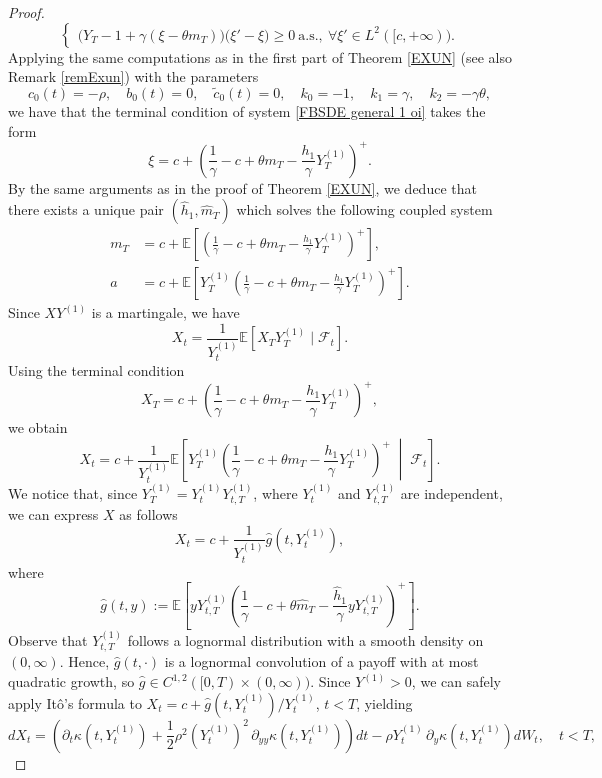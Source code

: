 \documentclass[10pt,a4paper]{amsart}
\begin{document}
\begin{proof}
\begin{equation}
\begin{cases}
       
        \big(Y_T-1+\gamma(\xi -\theta m_T)\big)\big( \xi'-\xi \big) \geq 0 \ \text{a.s.}, \ \forall \xi' \in L^2([c,+\infty)) .
\end{cases}
\end{equation}
Applying the same computations as in the first part of Theorem \ref{EXUN} (see also Remark \ref{remExun}) with the parameters
\[
c_0(t) = -\rho, \quad b_0(t) = 0, \quad \tilde{c}_0(t) = 0, \quad k_0 = -1, \quad k_1 = \gamma, \quad k_2 =-\gamma\theta,
\]
we have that the terminal condition of system \eqref{FBSDE general 1 oi} takes the form 
\begin{equation}
\label{terminal_X}
\xi=c + \left( \frac{1}{\gamma} - c + \theta m_T - \frac{h_1}{\gamma} Y_T^{(1)} \right)^{+}.
\end{equation}
By the same arguments as in the proof of Theorem \ref{EXUN}, we deduce that there exists a unique  pair $(\hat h_1, \hat m_T)$  which solves the following  coupled system
\begin{align*}
m_T &= c + \mathbb{E} \left[ \left( \frac{1}{\gamma} - c + \theta m_T - \frac{h_1}{\gamma} Y_T^{(1)} \right)^{+} \right], \\
a &= c + \mathbb{E} \left[ Y_T^{(1)} \left( \frac{1}{\gamma} - c + \theta m_T - \frac{h_1}{\gamma} Y_T^{(1)} \right)^{+} \right].
\end{align*}
Since \(X Y^{(1)}\) is a martingale, we have
\[
X_t = \frac{1}{Y_t^{(1)}}
\mathbb{E}\left[ X_T Y_T^{(1)} \mid \mathcal{F}_t \right].
\]
Using the terminal condition
\[X_T=c+\left(\frac{1}{\gamma} - c + \theta m_T-\frac{h_1}{\gamma} Y_T^{(1)}\right)^+,
\]
we obtain
\[
X_t=c+\frac{1}{Y_t^{(1)}}\mathbb{E}\left[Y_T^{(1)}
\left(\frac{1}{\gamma} - c + \theta m_T-\frac{h_1}{\gamma} Y_T^{(1)}\right)^+\;\middle|\;\mathcal{F}_t\right].\]
We notice that, since $Y^{(1)}_T = Y^{(1)}_t Y^{(1)}_{t,T}$, where $Y^{(1)}_t$ and $Y^{(1)}_{t,T}$ are independent, we can express $X$ as follows
\[
X_t = c + \frac{1}{Y^{(1)}_t} \hat g(t, Y^{(1)}_t),
\]
where
\[
\hat g(t,y) := \mathbb{E}\!\left[ yY^{(1)}_{t,T} \left(\frac{1}{\gamma} - c + \theta \hat m_T- \frac{\hat h_1 }{\gamma}yY^{(1)}_{t,T} \right)^+ \right].\]
Observe that $Y^{(1)}_{t,T}$ follows a lognormal distribution with a smooth density on $(0,\infty)$. Hence, $\hat g(t,\cdot)$ is a lognormal convolution of a payoff with at most quadratic growth, so $\hat g \in C^{1,2}([0,T) \times (0, \infty))$. Since $Y^{(1)} > 0$, we can safely apply It\^o's formula to $X_t = c+  \hat g(t,Y^{(1)}_t)/Y^{(1)}_t$, $t<T$, yielding
\[
dX_t = \left(\partial_t \kappa (t,Y^{(1)}_t) + \frac12 \rho^2 (Y_t ^{(1)})^2 \, \partial_{yy} \kappa (t,Y^{(1)}_t) \right)dt - \rho Y^{(1)}_t \, \partial_y \kappa (t,Y^{(1)}_t) dW_t, \quad t<T,
\]
\end{proof}
\end{document}
